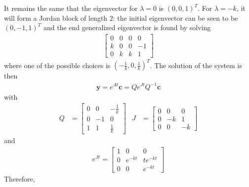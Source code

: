It remains the same that the eigenvector for $\lambda = 0$ is $(0,0,1)^T$. For $\lambda = -k$, it will form a Jordan block of length $2$: the initial eigenvector can be seen to be $(0,-1,1)^T$ and the end generalized eigenvector is found by solving
\begin{align*}
\left[\begin{array}{ccc|c}
0 & 0 & 0 & 0 \\
k & 0 & 0 & -1 \\
0 & k & k & 1
\end{array}\right]
\end{align*}
where one of the possible choices is $(-\frac{1}{k},0,\frac{1}{k})^T$. The solution of the system is then 
\begin{align*}
\textbf{y} = e^{At} \textbf{c} = Qe^{Jt}Q^{-1}\textbf{c}
\end{align*}
with
\begin{align*}
Q &= \begin{bmatrix}
0 & 0 & -\frac{1}{k}\\
0 & -1 & 0 \\
1 & 1 & \frac{1}{k}
\end{bmatrix} &
J &=
\begin{bmatrix}
0 & 0 & 0 \\
0 & -k & 1 \\
0 & 0 & -k
\end{bmatrix}
\end{align*}
and 
\begin{align*}
e^{Jt} =
\begin{bmatrix}
1 & 0 & 0 \\
0 & e^{-kt} & te^{-kt} \\
0 & 0 & e^{-kt}
\end{bmatrix}
\end{align*}
Therefore,
